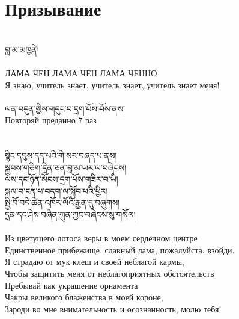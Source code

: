 \section{Призывание}
\\
\ti
བླ་མ་མཁྱནེ།\\
\\
\ru
ЛАМА ЧЕН ЛАМА ЧЕН ЛАМА ЧЕННО\\
Я знаю, учитель знает, учитель знает, учитель знает меня!\\
\\
\scriptsize \ti
ལན་བདུན་གྱིས་གདུང་བ་དྲག་པོས་བོས་ནས།\\
\ru
Повторяй преданно 7 раз\\
\\
\\
\normalsize
\ti
སྙིང་དབུས་དད་པའི་གེ་སར་བཞད་པ་ནས།\\
སྐྱབས་གཅིག་དྲིན་ཅན་བླ་མ་ཡར་ལ་བཞེངས།\\
ལས་དང་ཉོན་མོངས་དྲག་པོས་གཟིར་བ་ཡི།\\
སྐལ་བ་ངན་པ་བདག་ལ་སྐྱོབ་པའི་ཕྱིར།\\
སྤྱི་བོ་བདེ་ཆེན་འཁོར་ལོའི་རྒྱན་དུ་བཞུགས།\\
དྲན་དང་ཤེས་བཞིན་ཀུན་ཀྱང་བཞེངས་སུ་གསོལ།\\
\\
\ru
Из цветущего лотоса веры в моем сердечном центре \\
Единственное прибежище, славный лама, пожалуйста, взойди.\\
Я страдаю от мук клеш и своей неблагой кармы,\\
Чтобы защитить меня от неблагоприятных обстоятельств\\
Пребывай как украшение орнамента \\
Чакры великого блаженства в моей короне, \\
Зароди во мне внимательность и осознанность, молю тебя!\\
\\
